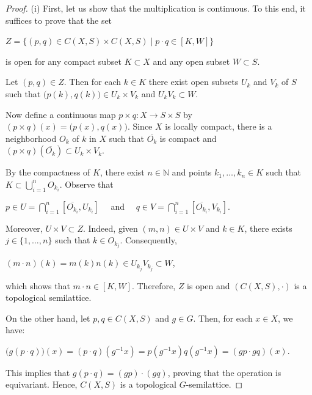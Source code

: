 \documentclass[12pt]{amsart}
\theoremstyle{definition}
\begin{document}
	\begin{proof}
		
		(i) First, let us show that the multiplication is continuous. To this end, it suffices to prove that the set 
		\begin{center}
			$Z=\{(p,q)\in C(X,S)\times C(X,S)\mid p\cdot q\in [K,W] \}$
		\end{center}
		is open for any compact subset $K\subset X$ and any open subset $W\subset S$. 
		
		Let $(p,q)\in Z$. Then for each $k\in K$ there exist open subsets $U_k$ and $V_k$ of $S$ such that $\big(p(k),q(k)\big)\in U_k\times V_k$ and $U_k V_k\subset W$. 
		
		Now define a continuous map $p\times q:X\rightarrow S\times S$ by $(p\times q)(x)=\big(p(x),q(x)\big)$. Since $X$ is locally compact, there is a neighborhood $O_k$ of $k$ in $X$ such that $\overline{O_k}$ is compact and $(p\times q)(\overline{O_k})\subset U_k\times V_k$. 
		
		By the compactness of $K$, there exist $n\in\mathbb{N}$ and points $k_1,\dots,k_n\in K$ such that $K\subset \bigcup\limits_{i=1}^nO_{k_i}$. Observe that
		
		\begin{center}
			$p\in U= \bigcap\limits_{i=1}^n[\overline{O_{k_i}},U_{k_i}]\quad$ and $\quad q\in  V= \bigcap\limits_{i=1}^n[\overline{O_{k_i}},V_{k_i}]$.
		\end{center}
		
		Moreover, $U\times V\subset Z$. Indeed, given $(m,n)\in U\times V$ and $k\in K$, there exists $j\in\{1,\dots,n\}$ such that $k\in O_{k_j}$. Consequently,
		
		\begin{center}
			$(m\cdot n)(k)=m(k) n(k)\in U_{k_j} V_{k_j}\subset W$,
		\end{center}
		which shows that $m\cdot n\in [K,W]$. Therefore, $Z$ is open and $(C(X,S),\cdot)$ is a topological semilattice.
		
		On the other hand, let $p,q\in C(X,S)$ and $g\in G$. Then, for each $x\in X$, we have:
		
		\begin{center}
			$\big(g(p\cdot q)\big)(x)=(p\cdot q)(g^{-1} x)=p(g^{-1} x)q(g^{-1} x)=(gp\cdot gq)(x)$.
		\end{center}
		
		This implies that $g(p\cdot q)=(gp)\cdot (gq)$, proving that the operation is equivariant. Hence, $C(X,S)$ is a topological $G$-semilattice.
		

\end{proof}
\end{document}
